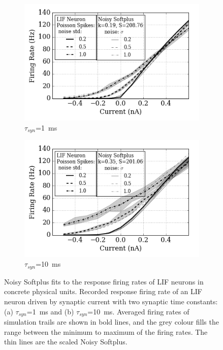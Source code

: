 \documentclass{article}
\begin{document}
	\begin{figure}
		\centering
		\begin{subfigure}[t]{0.48\textwidth}
			\includegraphics[width=\textwidth]{pics_iconip/4-1.png}
			\caption{$\tau_{syn}$=1~ms}
		\end{subfigure}
		\begin{subfigure}[t]{0.48\textwidth}
			\includegraphics[width=\textwidth]{pics_iconip/4-10.png}
			\caption{$\tau_{syn}$=10~ms}
		\end{subfigure}
		\caption{Noisy Softplus fits to the response firing rates of LIF neurons in concrete physical units.
		Recorded response firing rate of an LIF neuron driven by synaptic current with two synaptic time constants: (a) $\tau_{syn}$=1~ms and (b) $\tau_{syn}$=10~ms. Averaged firing rates of simulation trails are shown in bold lines, and the grey colour fills the range between the minimum to maximum of the firing rates. The thin lines are the scaled Noisy Softplus.}
		\label{Fig:nsptau1}
	\end{figure}
	
\end{document}
